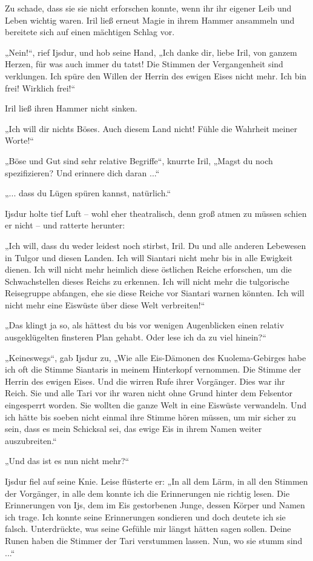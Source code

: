 Zu schade, dass sie sie nicht erforschen konnte, wenn ihr ihr eigener Leib und Leben wichtig waren. Iril ließ erneut Magie in ihrem Hammer ansammeln und bereitete sich auf einen mächtigen Schlag vor.

„Nein!“, rief Ijsdur, und hob seine Hand, „Ich danke dir, liebe Iril, von ganzem Herzen, für was auch immer du tatst! Die Stimmen der Vergangenheit sind verklungen. Ich spüre den Willen der Herrin des ewigen Eises nicht mehr. Ich bin frei! Wirklich frei!“

Iril ließ ihren Hammer nicht sinken.

„Ich will dir nichts Böses. Auch diesem Land nicht! Fühle die Wahrheit meiner Worte!“

„Böse und Gut sind sehr relative Begriffe“, knurrte Iril, „Magst du noch spezifizieren? Und erinnere dich daran ...“

„... dass du Lügen spüren kannst, natürlich.“

Ijsdur holte tief Luft – wohl eher theatralisch, denn groß atmen zu müssen schien er nicht – und ratterte herunter:

„Ich will, dass du weder leidest noch stirbst, Iril. Du und alle anderen Lebewesen in Tulgor und diesen Landen. Ich will Siantari nicht mehr bis in alle Ewigkeit dienen. Ich will nicht mehr heimlich diese östlichen Reiche erforschen, um die Schwachstellen dieses Reichs zu erkennen. Ich will nicht mehr die tulgorische Reisegruppe abfangen, ehe sie diese Reiche vor Siantari warnen könnten. Ich will nicht mehr eine Eiswüste über diese Welt verbreiten!“

„Das klingt ja so, als hättest du bis vor wenigen Augenblicken einen relativ ausgeklügelten finsteren Plan gehabt. Oder lese ich da zu viel hinein?“

„Keineswegs“, gab Ijsdur zu, „Wie alle Eis-Dämonen des Kuolema-Gebirges habe ich oft die Stimme Siantaris in meinem Hinterkopf vernommen. Die Stimme der Herrin des ewigen Eises. Und die wirren Rufe ihrer Vorgänger. Dies war ihr Reich. Sie und alle Tari vor ihr waren nicht ohne Grund hinter dem Felsentor eingesperrt worden. Sie wollten die ganze Welt in eine Eiswüste verwandeln. Und ich hätte bis soeben nicht einmal ihre Stimme hören müssen, um mir sicher zu sein, dass es mein Schicksal sei, das ewige Eis in ihrem Namen weiter auszubreiten.“

„Und das ist es nun nicht mehr?“

Ijsdur fiel auf seine Knie. Leise flüsterte er: „In all dem Lärm, in all den Stimmen der Vorgänger, in alle dem konnte ich die Erinnerungen nie richtig lesen. Die Erinnerungen von Ijs, dem im Eis gestorbenen Junge, dessen Körper und Namen ich trage. Ich konnte seine Erinnerungen sondieren und doch deutete ich sie falsch. Unterdrückte, was seine Gefühle mir längst hätten sagen sollen. Deine Runen haben die Stimmer der Tari verstummen lassen. Nun, wo sie stumm sind ...“

